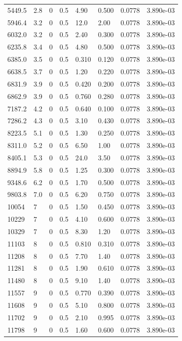 \documentclass[preview]{standalone}
\begin{document}
{{{\begin{tabular}{L{1.2cm}C{1.2cm} C{0.3cm}C{0.5cm} C{1.4cm}C{1.4cm} C{1.4cm}C{1.4cm}}
  5449.5  &   2.8  & 0     & 0.5 &  4.90  & 0.500  & 0.0778 &  3.890e-03   \\ 
  5946.4  &   3.2  & 0     & 0.5 &  12.0  & 2.00  & 0.0778 &  3.890e-03   \\ 
  6032.0  &   3.2  & 0     & 0.5 &  2.40  & 0.300  & 0.0778 &  3.890e-03   \\ 
  6235.8  &   3.4  & 0     & 0.5 &  4.80  & 0.500  & 0.0778 &  3.890e-03   \\ 
  6385.0  &   3.5  & 0     & 0.5 &  0.310  & 0.120  & 0.0778 &  3.890e-03   \\ 
  6638.5  &   3.7  & 0     & 0.5 &  1.20  & 0.220  & 0.0778 &  3.890e-03   \\ 
  6831.9  &   3.9  & 0     & 0.5 &  0.420  & 0.200  & 0.0778 &  3.890e-03   \\ 
  6862.9  &   3.9  & 0     & 0.5 &  0.760  & 0.280  & 0.0778 &  3.890e-03   \\ 
  7187.2  &   4.2  & 0     & 0.5 &  0.640  & 0.100  & 0.0778 &  3.890e-03   \\ 
  7286.2  &   4.3  & 0     & 0.5 &  3.10  & 0.430  & 0.0778 &  3.890e-03   \\ 
  8223.5  &   5.1  & 0     & 0.5 &  1.30  & 0.250  & 0.0778 &  3.890e-03   \\ 
  8311.0  &   5.2  & 0     & 0.5 &  6.50  & 1.00  & 0.0778 &  3.890e-03   \\ 
  8405.1  &   5.3  & 0     & 0.5 &  24.0  & 3.50  & 0.0778 &  3.890e-03   \\ 
  8894.9  &   5.8  & 0     & 0.5 &  1.25  & 0.300  & 0.0778 &  3.890e-03   \\ 
  9348.6  &   6.2  & 0     & 0.5 &  1.70  & 0.500  & 0.0778 &  3.890e-03   \\ 
  9803.8  &   7.0  & 0     & 0.5 &  6.20  & 0.750  & 0.0778 &  3.890e-03   \\ 
  10054  &     7  & 0     & 0.5 &  1.50  & 0.450  & 0.0778 &  3.890e-03   \\ 
  10229  &     7  & 0     & 0.5 &  4.10  & 0.600  & 0.0778 &  3.890e-03   \\ 
  10329  &     7  & 0     & 0.5 &  8.30  & 1.20  & 0.0778 &  3.890e-03   \\ 
  11103  &     8  & 0     & 0.5 &  0.810  & 0.310  & 0.0778 &  3.890e-03   \\ 
  11208  &     8  & 0     & 0.5 &  7.70  & 1.40  & 0.0778 &  3.890e-03   \\ 
  11281  &     8  & 0     & 0.5 &  1.90  & 0.610  & 0.0778 &  3.890e-03   \\ 
  11480  &     8  & 0     & 0.5 &  9.10  & 1.40  & 0.0778 &  3.890e-03   \\ 
  11557  &     9  & 0     & 0.5 &  0.770  & 0.390  & 0.0778 &  3.890e-03   \\ 
  11608  &     9  & 0     & 0.5 &  5.10  & 0.800  & 0.0778 &  3.890e-03   \\ 
  11702  &     9  & 0     & 0.5 &  2.10  & 0.995  & 0.0778 &  3.890e-03   \\ 
  11798  &     9  & 0     & 0.5 &  1.60  & 0.600  & 0.0778 &  3.890e-03   \\ 
\hline 
\end{tabular} 

}}}
\end{document}
